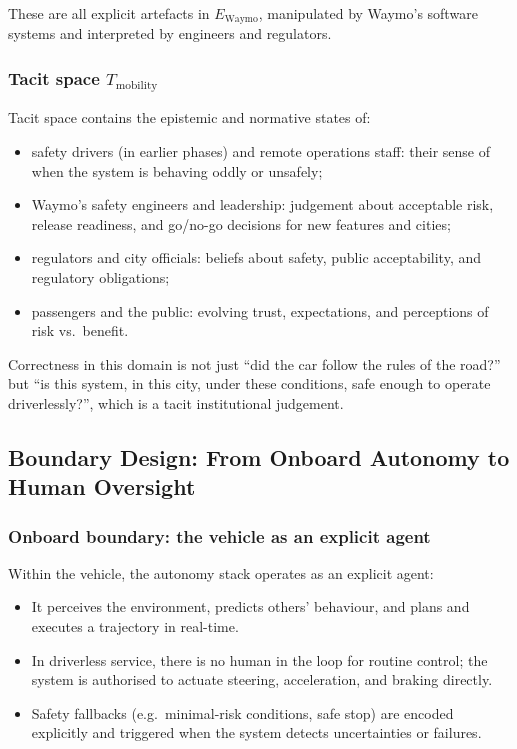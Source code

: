 These are all explicit artefacts in \(E_{\mathrm{Waymo}}\), manipulated by
Waymo’s software systems and interpreted by engineers and regulators.

\subsubsection*{Tacit space \(T_{\mathrm{mobility}}\)}

Tacit space contains the epistemic and normative states of:

\begin{itemize}
  \item safety drivers (in earlier phases) and remote operations staff:
        their sense of when the system is behaving oddly or unsafely;
  \item Waymo’s safety engineers and leadership:
        judgement about acceptable risk, release readiness, and go/no-go
        decisions for new features and cities;
  \item regulators and city officials:
        beliefs about safety, public acceptability, and regulatory
        obligations;
  \item passengers and the public:
        evolving trust, expectations, and perceptions of risk vs.\ benefit.
\end{itemize}

Correctness in this domain is not just “did the car follow the rules of the
road?” but “is this system, in this city, under these conditions, safe
enough to operate driverlessly?”, which is a tacit institutional judgement.

\subsection{Boundary Design:
  From Onboard Autonomy to Human Oversight}

\subsubsection*{Onboard boundary: the vehicle as an explicit agent}

Within the vehicle, the autonomy stack operates as an explicit agent:

\begin{itemize}
  \item It perceives the environment, predicts others’ behaviour, and plans
        and executes a trajectory in real-time.
  \item In driverless service, there is no human in the loop for routine
        control; the system is authorised to actuate steering, acceleration,
        and braking directly.
  \item Safety fallbacks (e.g.\ minimal-risk conditions, safe stop) are
        encoded explicitly and triggered when the system detects
        uncertainties or failures.
\end{itemize}

